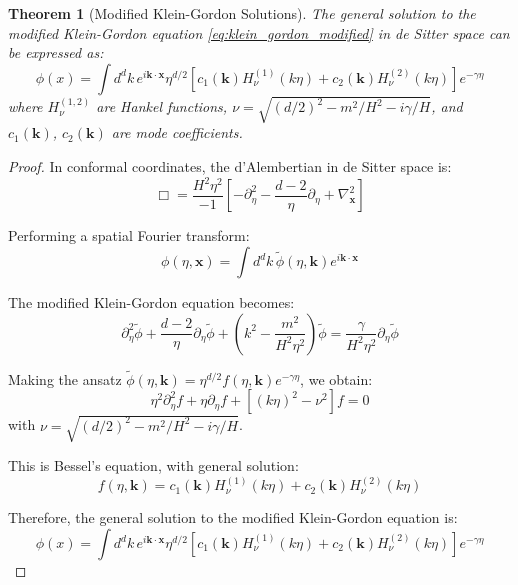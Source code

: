 \documentclass[11pt,english,twoside]{article}
\theoremstyle{plain}
\newtheorem{theorem}{Theorem}[section]
\theoremstyle{definition}
\theoremstyle{remark}
\newcommand{\gammaR}{\gamma}
\newcommand{\xb}{\mathbf{x}}
\newcommand{\kb}{\mathbf{k}}
\begin{document}
\begin{theorem}[Modified Klein-Gordon Solutions]
\label{thm:modified_kg}
The general solution to the modified Klein-Gordon equation \eqref{eq:klein_gordon_modified} in de Sitter space can be expressed as:
\begin{equation}
\phi(x) = \int d^dk \, e^{i\kb\cdot\xb} \eta^{d/2} \left[c_1(\kb) H_\nu^{(1)}(k\eta) + c_2(\kb) H_\nu^{(2)}(k\eta)\right] e^{-\gammaR\eta}
\end{equation}
where $H_\nu^{(1,2)}$ are Hankel functions, $\nu = \sqrt{(d/2)^2 - m^2/H^2 - i\gammaR/H}$, and $c_1(\kb)$, $c_2(\kb)$ are mode coefficients.
\end{theorem}

\begin{proof}
In conformal coordinates, the d'Alembertian in de Sitter space is:
\begin{equation}
\Box = \frac{H^2\eta^2}{-1}\left[-\partial_\eta^2 - \frac{d-2}{\eta}\partial_\eta + \nabla_{\xb}^2\right]
\end{equation}

Performing a spatial Fourier transform:
\begin{equation}
\phi(\eta,\xb) = \int d^dk \, \tilde{\phi}(\eta,\kb) e^{i\kb\cdot\xb}
\end{equation}

The modified Klein-Gordon equation becomes:
\begin{equation}
\partial_\eta^2\tilde{\phi} + \frac{d-2}{\eta}\partial_\eta\tilde{\phi} + \left(k^2 - \frac{m^2}{H^2\eta^2}\right)\tilde{\phi} = \frac{\gammaR}{H^2\eta^2}\partial_\eta\tilde{\phi}
\end{equation}

Making the ansatz $\tilde{\phi}(\eta,\kb) = \eta^{d/2}f(\eta,\kb)e^{-\gammaR\eta}$, we obtain:
\begin{equation}
\eta^2\partial_\eta^2 f + \eta\partial_\eta f + \left[(k\eta)^2 - \nu^2\right]f = 0
\end{equation}
with $\nu = \sqrt{(d/2)^2 - m^2/H^2 - i\gammaR/H}$.

This is Bessel's equation, with general solution:
\begin{equation}
f(\eta,\kb) = c_1(\kb) H_\nu^{(1)}(k\eta) + c_2(\kb) H_\nu^{(2)}(k\eta)
\end{equation}

Therefore, the general solution to the modified Klein-Gordon equation is:
\begin{equation}
\phi(x) = \int d^dk \, e^{i\kb\cdot\xb} \eta^{d/2} \left[c_1(\kb) H_\nu^{(1)}(k\eta) + c_2(\kb) H_\nu^{(2)}(k\eta)\right] e^{-\gammaR\eta}
\end{equation}
\end{proof}
\end{document}
